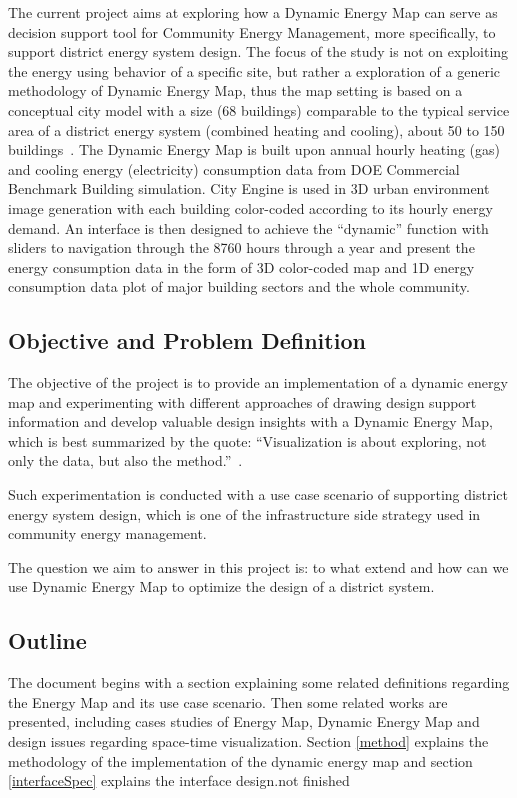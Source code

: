 \documentclass[hidelinks,12pt]{article}
\newcommand{\grey}[1]{\textcolor{black!30}{#1}}
\begin{document}
The current project aims at exploring how a Dynamic Energy Map can
serve as decision support tool for Community Energy Management, more
specifically, to support district energy system design. The focus of
the study is not on exploiting the energy using behavior of a specific
site, but rather a exploration of a generic methodology of Dynamic
Energy Map, thus the map setting is based on a conceptual city model
with a size (68 buildings) comparable to the typical service area of a
district energy system (combined heating and cooling), about 50 to 150
buildings~\cite{IDEA2005}. The Dynamic Energy Map is built upon annual
hourly heating (gas) and cooling energy (electricity) consumption data
from DOE Commercial Benchmark Building simulation. City Engine is used
in 3D urban environment image generation with each building
color-coded according to its hourly energy demand. An interface is
then designed to achieve the ``dynamic'' function with sliders to
navigation through the 8760 hours through a year and present the
energy consumption data in the form of 3D color-coded map and 1D
energy consumption data plot of major building sectors and the whole
community.

\subsection{Objective and Problem Definition}
The objective of the project is to provide an implementation of a
dynamic energy map and experimenting with different approaches of
drawing design support information and develop valuable design
insights with a Dynamic Energy Map, which is best summarized by the
quote: ``Visualization is about exploring, not only the data, but also
the method.''~\cite{Dorling1992}.

Such experimentation is conducted with a use case scenario of
supporting district energy system design, which is one of the
infrastructure side strategy used in community energy management.

The question we aim to answer in this project is: to what extend and
how can we use Dynamic Energy Map to optimize the design of a district
system.

\subsection{Outline}
The document begins with a section explaining some related definitions
regarding the Energy Map and its use case scenario. Then some related
works are presented, including cases studies of Energy Map, Dynamic
Energy Map and design issues regarding space-time visualization.
Section \ref{method} explains the methodology of the implementation of
the dynamic energy map and section \ref{interfaceSpec} explains the
interface design.\grey{not finished}
\end{document}
